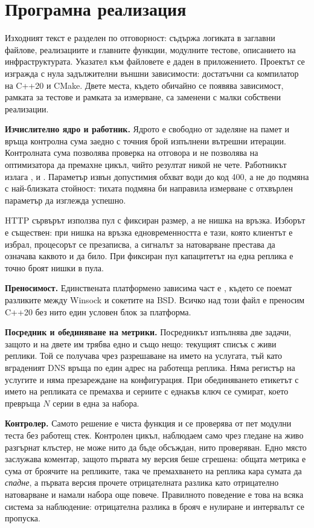 \section{Програмна реализация}
\label{sec:implementation}

Изходният текст е разделен по отговорност:  съдържа логиката в заглавни
файлове,  реализациите и главните функции,  модулните тестове,
 описанието на инфраструктурата. Указател към файловете е даден в приложението.
Проектът се изгражда с нула задължителни външни зависимости: достатъчни са компилатор на C++20 и
CMake. Двете места, където обичайно се появява зависимост, рамката за тестове и рамката за
измерване, са заменени с малки собствени реализации.

\textbf{Изчислително ядро и работник.} Ядрото е свободно от заделяне на памет и връща контролна
сума заедно с точния брой изпълнени вътрешни итерации. Контролната сума позволява проверка на
отговора и не позволява на оптимизатора да премахне цикъл, чийто резултат никой не чете.
Работникът излага ,  и . Параметър извън
допустимия обхват води до код 400, а не до подмяна с най-близката стойност: тихата подмяна би
направила измерване с отхвърлен параметър да изглежда успешно.

HTTP сървърът използва пул с фиксиран размер, а не нишка на връзка. Изборът е съществен: при нишка
на връзка едновременността е тази, която клиентът е избрал, процесорът се презаписва, а сигналът
за натоварване престава да означава каквото и да било. При фиксиран пул капацитетът на една
реплика е точно броят нишки в пула.

\textbf{Преносимост.} Единствената платформено зависима част е , където се
поемат разликите между Winsock и сокетите на BSD. Всичко над този файл е преносим C++20 без нито
един условен блок за платформа.

\textbf{Посредник и обединяване на метрики.} Посредникът изпълнява две задачи, защото и на двете
им трябва едно и също нещо: текущият списък с живи реплики. Той се получава чрез разрешаване на
името на услугата, тъй като вграденият DNS връща по един адрес на работеща реплика. Няма регистър
на услугите и няма презареждане на конфигурация. При обединяването етикетът с името на репликата
се премахва и сериите с еднакъв ключ се сумират, което превръща $N$ серии в една за набора.

\textbf{Контролер.} Самото решение е чиста функция и се проверява от пет модулни теста без
работещ стек. Контролен цикъл, наблюдаем само чрез гледане на живо разгърнат клъстер, не може нито
да бъде обсъждан, нито проверяван. Едно място заслужава коментар, защото първата му версия беше
сгрешена: общата метрика е сума от броячите на репликите, така че премахването на реплика кара
сумата да \emph{спадне}, а първата версия прочете отрицателната разлика като отрицателно
натоварване и намали набора още повече. Правилното поведение е това на всяка система за
наблюдение: отрицателна разлика в брояч е нулиране и интервалът се пропуска.


